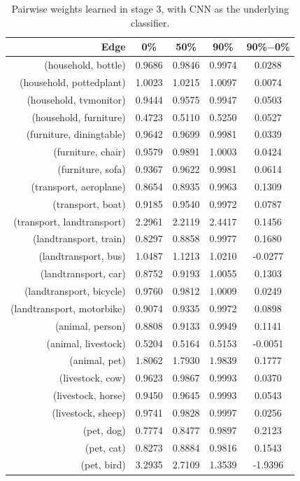 \documentclass[11pt,a4paper]{book}
\begin{document}
\begin{table}[htbp]
\centering
\begin{tabular}{r|c|c|c|c}
Edge & 0\% & 50\% & 90\% & 90\%$-$0\%\\\hline
(household, bottle)        & 0.9686 & 0.9846 & 0.9974 & 0.0288\\
(household, pottedplant)   & 1.0023 & 1.0215 & 1.0097 & 0.0074\\
(household, tvmonitor)     & 0.9444 & 0.9575 & 0.9947 & 0.0503\\
(household, furniture)     & 0.4723 & 0.5110 & 0.5250 & 0.0527\\
(furniture, diningtable)   & 0.9642 & 0.9699 & 0.9981 & 0.0339\\
(furniture, chair)         & 0.9579 & 0.9891 & 1.0003 & 0.0424\\
(furniture, sofa)          & 0.9367 & 0.9622 & 0.9981 & 0.0614\\
(transport, aeroplane)     & 0.8654 & 0.8935 & 0.9963 & 0.1309\\
(transport, boat)          & 0.9185 & 0.9540 & 0.9972 & 0.0787\\
(transport, landtransport) & 2.2961 & 2.2119 & 2.4417 & 0.1456\\
(landtransport, train)     & 0.8297 & 0.8858 & 0.9977 & 0.1680\\
(landtransport, bus)       & 1.0487 & 1.1213 & 1.0210 & -0.0277\\
(landtransport, car)       & 0.8752 & 0.9193 & 1.0055 & 0.1303\\
(landtransport, bicycle)   & 0.9760 & 0.9812 & 1.0009 & 0.0249\\
(landtransport, motorbike) & 0.9074 & 0.9335 & 0.9972 & 0.0898\\
(animal, person)           & 0.8808 & 0.9133 & 0.9949 & 0.1141\\
(animal, livestock)        & 0.5204 & 0.5164 & 0.5153 & -0.0051\\
(animal, pet)              & 1.8062 & 1.7930 & 1.9839 & 0.1777\\
(livestock, cow)           & 0.9623 & 0.9867 & 0.9993 & 0.0370\\
(livestock, horse)         & 0.9450 & 0.9645 & 0.9993 & 0.0543\\
(livestock, sheep)         & 0.9741 & 0.9828 & 0.9997 & 0.0256\\
(pet, dog)                 & 0.7774 & 0.8477 & 0.9897 & 0.2123\\
(pet, cat)                 & 0.8273 & 0.8884 & 0.9816 & 0.1543\\
(pet, bird)                & 3.2935 & 2.7109 & 1.3539 & -1.9396
\end{tabular}
\caption{Pairwise weights learned in stage 3, with CNN as the underlying classifier.}
\label{tab:cnnpairwise}
\end{table}
\end{document}
